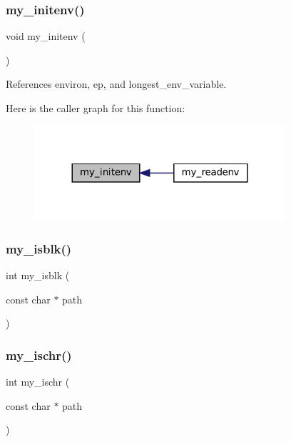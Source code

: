 \subsubsection{\texorpdfstring{my\+\_\+initenv()}{my\_initenv()}}
{\footnotesize\ttfamily void my\+\_\+initenv (\begin{DoxyParamCaption}{ }\end{DoxyParamCaption})}



References environ, ep, and longest\+\_\+env\+\_\+variable.

Here is the caller graph for this function\+:
\nopagebreak
\begin{figure}[H]
\begin{center}
\leavevmode
\includegraphics[width=264pt]{C-M__system_8c_ab5188f2ca99719a14c77a1acae06f93a_icgraph}
\end{center}
\end{figure}
\mbox{\label{C-M__system_8c_ad07b549d969a0670b0b8f7c6bef83e92}} 
\subsubsection{\texorpdfstring{my\+\_\+isblk()}{my\_isblk()}}
{\footnotesize\ttfamily int my\+\_\+isblk (\begin{DoxyParamCaption}\item[{const char $\ast$}]{path }\end{DoxyParamCaption})}

\mbox{\label{C-M__system_8c_ae59ec13b3517e84ddd30a0cd5352a01d}} 
\subsubsection{\texorpdfstring{my\+\_\+ischr()}{my\_ischr()}}
{\footnotesize\ttfamily int my\+\_\+ischr (\begin{DoxyParamCaption}\item[{const char $\ast$}]{path }\end{DoxyParamCaption})}

